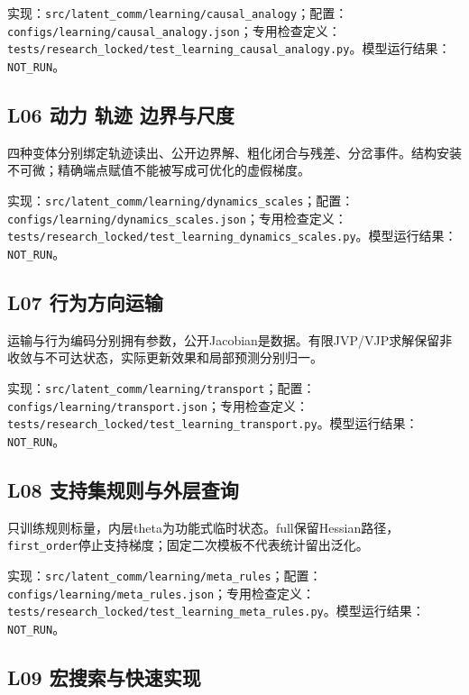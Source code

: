 \documentclass[
  10pt,
]{article}
\begin{document}
实现：{\small\nolinkurl{src/latent_comm/learning/causal_analogy}}；配置：{\small\nolinkurl{configs/learning/causal_analogy.json}}；专用检查定义：{\small\nolinkurl{tests/research_locked/test_learning_causal_analogy.py}}。模型运行结果：\nolinkurl{NOT_RUN}。

\subsection{L06 动力 轨迹
边界与尺度}\label{l06-ux52a8ux529b-ux8f68ux8ff9-ux8fb9ux754cux4e0eux5c3aux5ea6}

四种变体分别绑定轨迹读出、公开边界解、粗化闭合与残差、分岔事件。结构安装不可微；精确端点赋值不能被写成可优化的虚假梯度。

实现：{\small\nolinkurl{src/latent_comm/learning/dynamics_scales}}；配置：{\small\nolinkurl{configs/learning/dynamics_scales.json}}；专用检查定义：{\small\nolinkurl{tests/research_locked/test_learning_dynamics_scales.py}}。模型运行结果：\nolinkurl{NOT_RUN}。

\subsection{L07
行为方向运输}\label{l07-ux884cux4e3aux65b9ux5411ux8fd0ux8f93}

运输与行为编码分别拥有参数，公开Jacobian是数据。有限JVP/VJP求解保留非收敛与不可达状态，实际更新效果和局部预测分别归一。

实现：{\small\nolinkurl{src/latent_comm/learning/transport}}；配置：{\small\nolinkurl{configs/learning/transport.json}}；专用检查定义：{\small\nolinkurl{tests/research_locked/test_learning_transport.py}}。模型运行结果：\nolinkurl{NOT_RUN}。

\subsection{L08
支持集规则与外层查询}\label{l08-ux652fux6301ux96c6ux89c4ux5219ux4e0eux5916ux5c42ux67e5ux8be2}

只训练规则标量，内层theta为功能式临时状态。full保留Hessian路径，\nolinkurl{first_order}停止支持梯度；固定二次模板不代表统计留出泛化。

实现：{\small\nolinkurl{src/latent_comm/learning/meta_rules}}；配置：{\small\nolinkurl{configs/learning/meta_rules.json}}；专用检查定义：{\small\nolinkurl{tests/research_locked/test_learning_meta_rules.py}}。模型运行结果：\nolinkurl{NOT_RUN}。

\subsection{L09
宏搜索与快速实现}\label{l09-ux5b8fux641cux7d22ux4e0eux5febux901fux5b9eux73b0}
\end{document}
